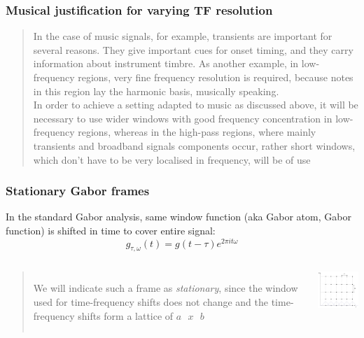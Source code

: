 \documentclass{beamer}
\begin{document}
\begin{frame}
	\frametitle{Musical justification for varying TF resolution}
	\begin{quote}
		In the case of music signals, for example, transients are important for several reasons. They give important cues for onset timing, and they carry information about instrument timbre. As another example, in low-frequency regions, very fine frequency resolution is required, because notes in this region lay the harmonic basis, musically speaking.\\
		\vspace{0.4em}
		In order to achieve a setting adapted to music as discussed above, it will be necessary to use wider windows with good frequency concentration in low-frequency regions, whereas in the high-pass regions, where mainly transients and broadband signals components occur, rather short windows, which don't have to be very localised in frequency, will be of use 
	\end{quote}
\end{frame}

\begin{frame}
	\frametitle{Stationary Gabor frames}
	In the standard Gabor analysis, same window function (aka Gabor atom, Gabor function) is shifted in time to cover entire signal:
	\[ g_{\tau, \omega}(t) = g(t - \tau)e^{2\pi i t \omega} \]

	\begin{columns}
		\begin{quote}
			We will indicate such a frame as \textit{stationary}, since the window used for time-frequency shifts does not change and the time-frequency shifts form a lattice of $a\text{ }x\text{ }b$
		\end{quote}
		\hspace{-2em}
	    \centering
	     \includegraphics[width=4cm]{stationarygabor.png}
        \end{columns} 
\end{frame}
\end{document}
